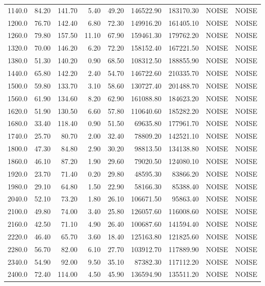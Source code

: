 \begin{tabular}{r|rr|rr|rr|rr}
1140.0 & 84.20 & 141.70 & 5.40 & 49.20 & 146522.90 & 183170.30 & NOISE & NOISE \\
1200.0 & 76.70 & 142.40 & 6.80 & 72.30 & 149916.20 & 161405.10 & NOISE & NOISE \\
1260.0 & 79.80 & 157.50 & 11.10 & 67.90 & 159461.30 & 179762.20 & NOISE & NOISE \\
1320.0 & 70.00 & 146.20 & 6.20 & 72.20 & 158152.40 & 167221.50 & NOISE & NOISE \\
1380.0 & 51.30 & 140.20 & 0.90 & 68.50 & 108312.50 & 188855.90 & NOISE & NOISE \\
1440.0 & 65.80 & 142.20 & 2.40 & 54.70 & 146722.60 & 210335.70 & NOISE & NOISE \\
1500.0 & 59.80 & 133.70 & 3.10 & 58.60 & 130727.40 & 201488.70 & NOISE & NOISE \\
1560.0 & 61.90 & 134.60 & 8.20 & 62.90 & 161088.80 & 184623.20 & NOISE & NOISE \\
1620.0 & 51.90 & 130.50 & 6.60 & 57.80 & 110640.60 & 185282.20 & NOISE & NOISE \\
1680.0 & 33.40 & 118.40 & 0.90 & 51.50 & 69635.80 & 177961.70 & NOISE & NOISE \\
1740.0 & 25.70 & 80.70 & 2.00 & 32.40 & 78809.20 & 142521.10 & NOISE & NOISE \\
1800.0 & 47.30 & 84.80 & 2.90 & 30.20 & 98813.50 & 134138.80 & NOISE & NOISE \\
1860.0 & 46.10 & 87.20 & 1.90 & 29.60 & 79020.50 & 124080.10 & NOISE & NOISE \\
1920.0 & 23.70 & 71.40 & 0.20 & 29.80 & 48595.30 & 83866.20 & NOISE & NOISE \\
1980.0 & 29.10 & 64.80 & 1.50 & 22.90 & 58166.30 & 85388.40 & NOISE & NOISE \\
2040.0 & 52.10 & 73.20 & 1.80 & 26.10 & 106671.50 & 95863.40 & NOISE & NOISE \\
2100.0 & 49.80 & 74.00 & 3.40 & 25.80 & 126057.60 & 116008.60 & NOISE & NOISE \\
2160.0 & 42.50 & 71.10 & 4.90 & 26.40 & 100687.60 & 141594.40 & NOISE & NOISE \\
2220.0 & 46.40 & 65.70 & 3.60 & 18.40 & 125163.80 & 121825.60 & NOISE & NOISE \\
2280.0 & 56.70 & 82.00 & 6.10 & 27.70 & 103912.70 & 117889.90 & NOISE & NOISE \\
2340.0 & 54.90 & 92.00 & 9.50 & 35.10 & 87382.30 & 117112.20 & NOISE & NOISE \\
2400.0 & 72.40 & 114.00 & 4.50 & 45.90 & 136594.90 & 135511.20 & NOISE & NOISE \\

\end{tabular}
